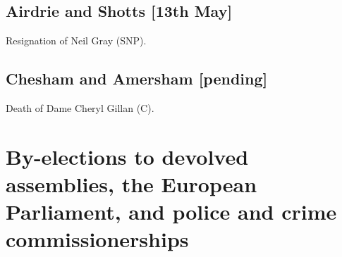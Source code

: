 \documentclass[a4paper,openany]{book}
\begin{document}


\section*{Airdrie and Shotts \hspace*{\fill}\nolinebreak[1]%
	\enspace\hspace*{\fill}
	[13th May]}


Resignation of Neil Gray (SNP).

\section*{Chesham and Amersham \hspace*{\fill}\nolinebreak[1]%
	\enspace\hspace*{\fill}
	[pending]}


Death of Dame Cheryl Gillan (C).

\chapter{By-elections to devolved assemblies, the European Parliament, and police and crime commissionerships}
\end{document}
